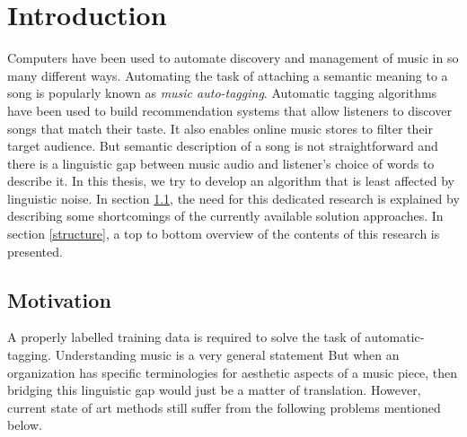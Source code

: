 

\chapter{Introduction} %

\label{Chapter1} %


\newcommand{\keyword}[1]{\textbf{#1}}
\newcommand{\tabhead}[1]{\textbf{#1}}
\newcommand{\code}[1]{\texttt{#1}}
\newcommand{\file}[1]{\texttt{\bfseries#1}}
\newcommand{\option}[1]{\texttt{\itshape#1}}



Computers have been used to automate discovery and management of music in so many different ways. Automating the task of attaching a semantic meaning to a song is popularly known as \textit{music auto-tagging}. Automatic tagging algorithms have been used to build recommendation systems that allow listeners to discover songs that match their taste. It also enables online music stores to filter their target audience. But semantic description of a song is not straightforward and there is a linguistic gap between music audio and listener's choice of words to describe it. In this thesis, we try to develop an algorithm that is least affected by linguistic noise. In section \ref{motivation}, the need for this dedicated research is explained by describing some shortcomings of the currently available solution approaches. In section \ref{structure}, a top to bottom overview of the contents of this research is presented.   


\section{Motivation}
\label{motivation}
A properly labelled training data is required to solve the task of automatic-tagging. 
Understanding music is a very general statement
But when an organization has specific terminologies for aesthetic aspects of a music piece, then bridging this linguistic gap would just be a matter of translation.   
However, current state of art methods still suffer from the following problems mentioned below.

